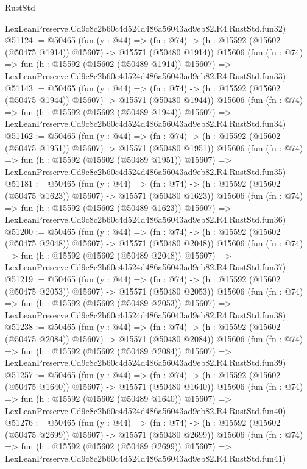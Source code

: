 \begin{lexlean}{RustStd}
\begin{coremodule}
    LexLeanPreserve.Cd9c8c2b60c4d524d486a56043ad9eb82.R4.RustStd.fun32)
@51124 := @50465
    (fun (y : @44) =>
    (fn : @74) -> (h : @15592 (@15602 (@50475 @1914)) @15607) -> @15571 (@50480 @1914))
    @15606
    (fun (fn : @74) =>
    fun (h : @15592 (@15602 (@50489 @1914)) @15607) =>
    LexLeanPreserve.Cd9c8c2b60c4d524d486a56043ad9eb82.R4.RustStd.fun33)
@51143 := @50465
    (fun (y : @44) =>
    (fn : @74) -> (h : @15592 (@15602 (@50475 @1944)) @15607) -> @15571 (@50480 @1944))
    @15606
    (fun (fn : @74) =>
    fun (h : @15592 (@15602 (@50489 @1944)) @15607) =>
    LexLeanPreserve.Cd9c8c2b60c4d524d486a56043ad9eb82.R4.RustStd.fun34)
@51162 := @50465
    (fun (y : @44) =>
    (fn : @74) -> (h : @15592 (@15602 (@50475 @1951)) @15607) -> @15571 (@50480 @1951))
    @15606
    (fun (fn : @74) =>
    fun (h : @15592 (@15602 (@50489 @1951)) @15607) =>
    LexLeanPreserve.Cd9c8c2b60c4d524d486a56043ad9eb82.R4.RustStd.fun35)
@51181 := @50465
    (fun (y : @44) =>
    (fn : @74) -> (h : @15592 (@15602 (@50475 @1623)) @15607) -> @15571 (@50480 @1623))
    @15606
    (fun (fn : @74) =>
    fun (h : @15592 (@15602 (@50489 @1623)) @15607) =>
    LexLeanPreserve.Cd9c8c2b60c4d524d486a56043ad9eb82.R4.RustStd.fun36)
@51200 := @50465
    (fun (y : @44) =>
    (fn : @74) -> (h : @15592 (@15602 (@50475 @2048)) @15607) -> @15571 (@50480 @2048))
    @15606
    (fun (fn : @74) =>
    fun (h : @15592 (@15602 (@50489 @2048)) @15607) =>
    LexLeanPreserve.Cd9c8c2b60c4d524d486a56043ad9eb82.R4.RustStd.fun37)
@51219 := @50465
    (fun (y : @44) =>
    (fn : @74) -> (h : @15592 (@15602 (@50475 @2053)) @15607) -> @15571 (@50480 @2053))
    @15606
    (fun (fn : @74) =>
    fun (h : @15592 (@15602 (@50489 @2053)) @15607) =>
    LexLeanPreserve.Cd9c8c2b60c4d524d486a56043ad9eb82.R4.RustStd.fun38)
@51238 := @50465
    (fun (y : @44) =>
    (fn : @74) -> (h : @15592 (@15602 (@50475 @2084)) @15607) -> @15571 (@50480 @2084))
    @15606
    (fun (fn : @74) =>
    fun (h : @15592 (@15602 (@50489 @2084)) @15607) =>
    LexLeanPreserve.Cd9c8c2b60c4d524d486a56043ad9eb82.R4.RustStd.fun39)
@51257 := @50465
    (fun (y : @44) =>
    (fn : @74) -> (h : @15592 (@15602 (@50475 @1640)) @15607) -> @15571 (@50480 @1640))
    @15606
    (fun (fn : @74) =>
    fun (h : @15592 (@15602 (@50489 @1640)) @15607) =>
    LexLeanPreserve.Cd9c8c2b60c4d524d486a56043ad9eb82.R4.RustStd.fun40)
@51276 := @50465
    (fun (y : @44) =>
    (fn : @74) -> (h : @15592 (@15602 (@50475 @2699)) @15607) -> @15571 (@50480 @2699))
    @15606
    (fun (fn : @74) =>
    fun (h : @15592 (@15602 (@50489 @2699)) @15607) =>
    LexLeanPreserve.Cd9c8c2b60c4d524d486a56043ad9eb82.R4.RustStd.fun41)

\end{coremodule}
\end{lexlean}
